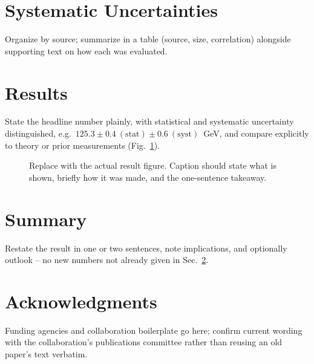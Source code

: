 \documentclass[11pt]{article}
\begin{document}
\section{Systematic Uncertainties}
\label{sec:systematics}

Organize by source; summarize in a table (source, size, correlation)
alongside supporting text on how each was evaluated.

\section{Results}
\label{sec:results}

State the headline number plainly, with statistical and systematic
uncertainty distinguished, e.g.\ $125.3 \pm 0.4~\mathrm{(stat)} \pm
0.6~\mathrm{(syst)}$~GeV, and compare explicitly to theory or prior
measurements (Fig.~\ref{fig:result}).

\begin{figure}[htbp]
  \centering
  \caption{Replace with the actual result figure. Caption should state what
    is shown, briefly how it was made, and the one-sentence takeaway.}
  \label{fig:result}
\end{figure}

\section{Summary}
\label{sec:summary}

Restate the result in one or two sentences, note implications, and
optionally outlook -- no new numbers not already given in
Sec.~\ref{sec:results}.

\section*{Acknowledgments}

Funding agencies and collaboration boilerplate go here; confirm current
wording with the collaboration's publications committee rather than reusing
an old paper's text verbatim.



\end{document}
